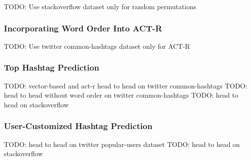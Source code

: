 \documentclass[man]{apa6}
\begin{document}
TODO: Use stackoverflow dataset only for random permutations

\subsubsection{Incorporating Word Order Into ACT-R}

TODO: Use twitter common-hashtags dataset only for ACT-R

\subsubsection{Top Hashtag Prediction}

TODO: vector-based and act-r head to head on twitter common-hashtags
TODO: head to head without word order on twitter common-hashtags
TODO: head to head on stackoverflow

\subsubsection{User-Customized Hashtag Prediction}

TODO: head to head on twitter popular-users dataset
TODO: head to head on stackoverflow


\printbibliography
\end{document}
